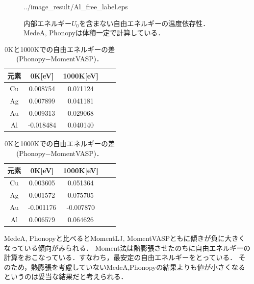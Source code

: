 \begin{figure}[htbp]
\begin{minipage}[b]{0.5\linewidth}
  {../image_result/Al_free_label.eps}
  \label{free4}
 \end{minipage}
 \caption{内部エネルギー$U_0$を含まない自由エネルギーの温度依存性．MedeA, Phonopyは体積一定で計算している．}\label{fig:freeresult}
\end{figure}



\begin{table}[htbp]
  \begin{minipage}[b]{0.48\linewidth}
  \centering
  \caption{0Kと1000Kでの自由エネルギーの差(MedeA$-$MomentVASP)．}
  \label{tb:free-diff}
  \begin{tabular}{ccccc}\hline
    元素 & 0K[eV] & 1000K[eV] \\ \hline \hline
    Cu & 0.008754 & 0.071124 \\
    Ag & 0.007899 & 0.041181\\
    Au & 0.009313 & 0.029068\\
    Al & -0.018484 & 0.040140\\ \hline
  \end{tabular}
 \end{minipage}
 \hspace{0.04\linewidth}
 \begin{minipage}[b]{0.48\linewidth}
 \caption{0Kと1000Kでの自由エネルギーの差(Phonopy$-$MomentVASP)．}
 \label{tb:free-diff2}
  \centering
  \begin{tabular}{ccccc}\hline
    元素 & 0K[eV] & 1000K[eV] \\ \hline \hline
    Cu & 0.003605 & 0.051364  \\
    Ag & 0.001572 & 0.075705 \\
    Au & -0.001176 & -0.007870 \\
    Al & 0.006579 & 0.064626 \\ \hline
  \end{tabular}
 \end{minipage}
\end{table}


MedeA, Phonopyと比べるとMomentLJ, MomentVASPともに傾きが負に大きくなっている傾向がみられる．
Moment法は熱膨張させたのちに自由エネルギーの計算をおこなっている．すなわち，最安定の自由エネルギーをとっている．
そのため，熱膨張を考慮していないMedeA,Phonopyの結果よりも値が小さくなるというのは妥当な結果だと考えられる．



